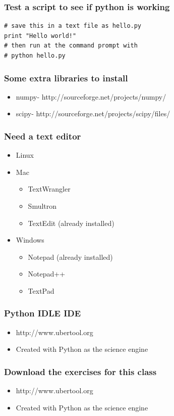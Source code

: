 \documentclass{beamer}
\begin{document}
\begin{frame}[fragile]
\frametitle{Test a script to see if python is working}
\begin{lstlisting}
# save this in a text file as hello.py
print "Hello world!"
# then run at the command prompt with 
# python hello.py
\end{lstlisting}
\end{frame}

\begin{frame}[fragile]
\frametitle{Some extra libraries to install}
\begin{itemize}
  \item{numpy- http://sourceforge.net/projects/numpy/}
  \item{scipy- http://sourceforge.net/projects/scipy/files/}
\end{itemize} 
\end{frame}

\begin{frame}[fragile]
\frametitle{Need a text editor}
\begin{itemize}
  \item{Linux}
  \item{Mac}
  \begin{itemize}
  \item TextWrangler
  \item Smultron
  \item TextEdit (already installed)
  \end{itemize}
  \item{Windows}
  \begin{itemize}
  \item Notepad (already installed)
  \item Notepad++
  \item TextPad
  \end{itemize}
\end{itemize} 
\end{frame}

\begin{frame}[fragile]
\frametitle{Python IDLE IDE}
\begin{itemize}
  \item{http://www.ubertool.org}
  \item{Created with Python as the science engine}
\end{itemize} 
\end{frame}

\begin{frame}[fragile]
\frametitle{Download the exercises for this class}
\begin{itemize}
  \item{http://www.ubertool.org}
  \item{Created with Python as the science engine}
\end{itemize} 
\end{frame}
\end{document}
